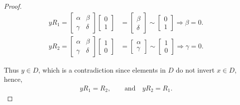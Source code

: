 \documentclass[a4paper , 11pt]{book}
\theoremstyle{definition}
\theoremstyle{remark}
\begin{document}
\begin{proof}
\begin{align*} y R_1 = \begin{bmatrix} \alpha & \beta \\ \gamma & \delta \end{bmatrix} \begin{bmatrix} 0 \\ 1 \end{bmatrix} &= \begin{bmatrix} \beta \\ \delta \end{bmatrix} \sim \begin{bmatrix} 0 \\ 1 \end{bmatrix} \Longrightarrow \beta = 0.
\\[1.5ex] y R_2 = \begin{bmatrix} \alpha & \beta \\ \gamma & \delta \end{bmatrix} \begin{bmatrix} 1 \\ 0 \end{bmatrix} &= \begin{bmatrix} \alpha \\ \gamma \end{bmatrix} \sim \begin{bmatrix} 1 \\ 0 \end{bmatrix} \Longrightarrow \gamma = 0.
\end{align*}

Thus $y \in D$, which is a contradiction since elements in $D$ do not invert $x \in D$, hence,
\begin{align}\label{yinterchange} y R_1 = R_2, \qquad \text{and} \quad y R_2 = R_1.
\end{align}
 

\end{proof}
\end{document}
